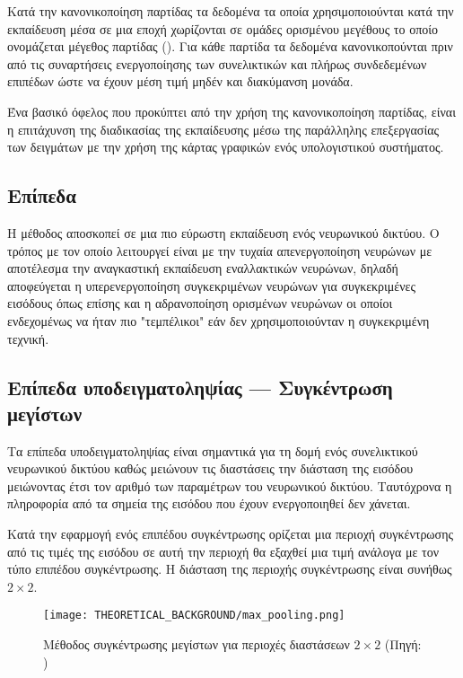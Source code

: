 Κατά την κανονικοποίηση παρτίδας τα δεδομένα τα οποία χρησιμοποιούνται κατά την εκπαίδευση μέσα σε μια εποχή χωρίζονται σε ομάδες ορισμένου μεγέθους το οποίο ονομάζεται μέγεθος παρτίδας (). Για κάθε παρτίδα τα δεδομένα κανονικοπούνται πριν από τις συναρτήσεις ενεργοποίησης των συνελικτικών και πλήρως συνδεδεμένων επιπέδων ώστε να έχουν μέση τιμή μηδέν και διακύμανση μονάδα.

Ένα βασικό όφελος που προκύπτει από την χρήση της κανονικοποίηση παρτίδας, είναι η επιτάχυνση της διαδικασίας της εκπαίδευσης μέσω της παράλληλης επεξεργασίας των δειγμάτων με την χρήση της κάρτας γραφικών ενός υπολογιστικού συστήματος.

\subsection{Επίπεδα }
Η μέθοδος  αποσκοπεί σε μια πιο εύρωστη εκπαίδευση ενός νευρωνικού δικτύου. Ο τρόπος με τον οποίο λειτουργεί είναι με την τυχαία απενεργοποίηση νευρώνων με αποτέλεσμα την αναγκαστική εκπαίδευση εναλλακτικών νευρώνων, δηλαδή αποφεύγεται η υπερενεργοποίηση συγκεκριμένων νευρώνων για συγκεκριμένες εισόδους όπως επίσης και η αδρανοποίηση ορισμένων νευρώνων οι οποίοι ενδεχομένως να ήταν πιο "τεμπέλικοι" εάν δεν χρησιμοποιούνταν η συγκεκριμένη τεχνική.

\subsection{Επίπεδα υποδειγματοληψίας --- Συγκέντρωση μεγίστων }
Τα επίπεδα υποδειγματοληψίας είναι σημαντικά για τη δομή ενός συνελικτικού νευρωνικού δικτύου καθώς μειώνουν τις διαστάσεις την διάσταση της εισόδου μειώνοντας έτσι τον αριθμό των παραμέτρων του νευρωνικού δικτύου. Ταυτόχρονα η πληροφορία από τα σημεία της εισόδου που έχουν ενεργοποιηθεί δεν χάνεται. 

Κατά την εφαρμογή ενός επιπέδου συγκέντρωσης ορίζεται μια περιοχή συγκέντρωσης από τις τιμές της εισόδου σε αυτή την περιοχή θα εξαχθεί μια τιμή ανάλογα με τον τύπο επιπέδου συγκέντρωσης. Η διάσταση της περιοχής συγκέντρωσης είναι συνήθως $2\times2$. 

\begin{figure}[H]
  \begin{center}
    \texttt{[image: THEORETICAL\_BACKGROUND/max\_pooling.png]}
    \caption{Μέθοδος συγκέντρωσης μεγίστων για περιοχές διαστάσεων $2\times2$ (Πηγή: \href{https://computersciencewiki.org/index.php/Max-pooling_/_Pooling}{})}
  \end{center}
\end{figure}

